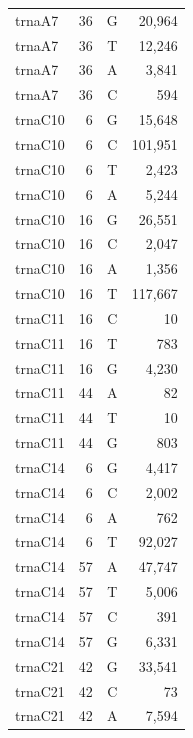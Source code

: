 \documentclass[12pt]{rockefeller}
\begin{document}
\begin{tiny}
\begin{longtable}{|l|r|c|r|}
  trnaA7 &        36 &          G &     20,964 \\
  trnaA7 &        36 &          T &     12,246 \\
  trnaA7 &        36 &          A &      3,841 \\
  trnaA7 &        36 &          C &        594 \\
 trnaC10 &         6 &          G &     15,648 \\
 trnaC10 &         6 &          C &    101,951 \\
 trnaC10 &         6 &          T &      2,423 \\
 trnaC10 &         6 &          A &      5,244 \\
 trnaC10 &        16 &          G &     26,551 \\
 trnaC10 &        16 &          C &      2,047 \\
 trnaC10 &        16 &          A &      1,356 \\
 trnaC10 &        16 &          T &    117,667 \\
 trnaC11 &        16 &          C &         10 \\
 trnaC11 &        16 &          T &        783 \\
 trnaC11 &        16 &          G &      4,230 \\
 trnaC11 &        44 &          A &         82 \\
 trnaC11 &        44 &          T &         10 \\
 trnaC11 &        44 &          G &        803 \\
 trnaC14 &         6 &          G &      4,417 \\
 trnaC14 &         6 &          C &      2,002 \\
 trnaC14 &         6 &          A &        762 \\
 trnaC14 &         6 &          T &     92,027 \\
 trnaC14 &        57 &          A &     47,747 \\
 trnaC14 &        57 &          T &      5,006 \\
 trnaC14 &        57 &          C &        391 \\
 trnaC14 &        57 &          G &      6,331 \\
 trnaC21 &        42 &          G &     33,541 \\
 trnaC21 &        42 &          C &         73 \\
 trnaC21 &        42 &          A &      7,594 \\

\end{longtable}
\end{tiny}
\end{document}
